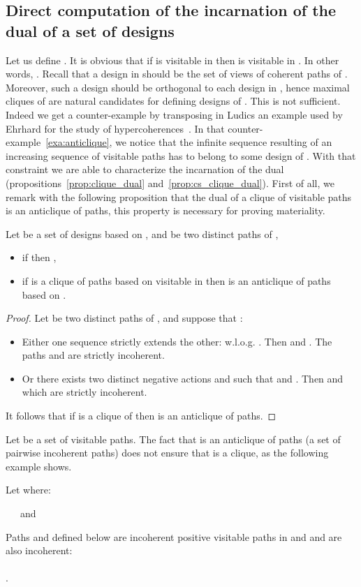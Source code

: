 \documentclass{LMCS}
\begin{document}
\subsection{Direct computation of the incarnation of the dual of a set of designs}
 
Let us define
. It is obvious that if  is visitable in  then  is visitable in . In other words, . 
Recall that a design in  should be the set of views of coherent paths of . Moreover, such a design should be orthogonal to each design in , hence
maximal cliques of  are natural candidates for defining designs of . 
This is not sufficient. Indeed we get a counter-example by transposing in Ludics an example used by Ehrhard for the study of hypercoherences~\cite{DBLP:journals/tcs/Ehrhard00}. In that counter-example~\ref{exa:anticlique}, we notice that the infinite sequence resulting   of an increasing sequence of visitable paths has to belong to some design of .
With that constraint we are able to characterize the incarnation of the dual (propositions~\ref{prop:clique_dual} and~\ref{prop:cs_clique_dual}).
First of all, we remark with the following proposition that the dual of a clique of visitable paths is an anticlique of paths, this property is necessary for proving materiality.

\begin{prop}
Let  be a set of designs based on ,  and  be two distinct paths of ,
\begin{itemize}
\item if  then ,
\item if  is a clique of paths based on  visitable in  then  is an anticlique of paths based on .
\end{itemize}
\end{prop}

\begin{proof}
Let  be two distinct paths of , and suppose that :
\begin{itemize}
\item Either one sequence strictly extends the other: w.l.o.g. . 
Then  and . The paths  and  are strictly incoherent.
\item Or there exists two distinct negative actions  and  such that  and . 
Then  and   which are strictly incoherent. 
\end{itemize}
It follows that if  is a clique of  then  is an anticlique of paths.
\end{proof}

Let  be a set of visitable paths. The fact that  is an anticlique of paths (a set of pairwise incoherent paths) does not ensure that  is a clique, as the following example shows.
\begin{exa}\label{exa:anticlique}
Let  where:\\
\begin{center}

~~~and~~~

\end{center}
Paths  
and  defined below are incoherent positive visitable paths in  and  and  are also incoherent:\\
\\
.
\end{exa}
\end{document}
